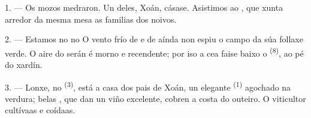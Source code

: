 %
%

\VUsaut{4.0mm}
\VUsaut{1.6mm}
\VUsaut{3.2mm}

\VUsaut{1.6mm}
\VUsaut{2.6mm}

\VUsaut{3.0mm}

1. --- Os mozos medraron. Un deles, Xoán, cásase. Asistimos ao , que
xunta arredor da mesma mesa as familias dos noivos.

2. --- Estamos no  no  O vento frío de
 e de  aínda non espiu o campo da súa follaxe verde.
O aire do serán é morno e recendente; por iso a cea faise baixo o 
\textsuperscript{(8)}, ao pé do xardín.

3. --- Lonxe, no  \textsuperscript{(3)}, está a casa dos pais de Xoán, un
elegante  \textsuperscript{(1)} agochado na verdura; belas
, que dan un viño excelente, cobren a costa do outeiro. O viticultor
cultívaas e coídaas.

